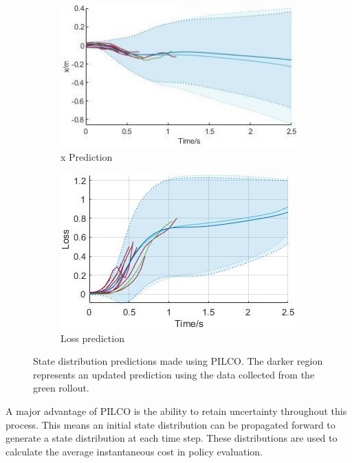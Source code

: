 \documentclass[twoside,twocolumn,12pt]{article}
\begin{document}
\begin{figure}[ht!]
  \centering
  \begin{subfigure}[t]{0.5\textwidth}
    \includegraphics[width=\linewidth]{u2}
  \caption{x Prediction} 
  \label{sub:ffffffs}
  \end{subfigure}
  \begin{subfigure}[t]{0.5\textwidth}
    \includegraphics[width=\linewidth]{loss2}
  \caption{Loss prediction}
  \label{sub:ffs}
  \end{subfigure}
  \caption{State distribution predictions made using PILCO. The darker region represents an updated prediction using the data collected from the green rollout.}
  \label{fig:pilco}
\end{figure}
A major advantage of PILCO is the ability to retain uncertainty throughout this process. This means an initial state distribution can be propagated forward to generate a state distribution at each time step. These distributions are used to calculate the average instantaneous cost in policy evaluation.
\end{document}

